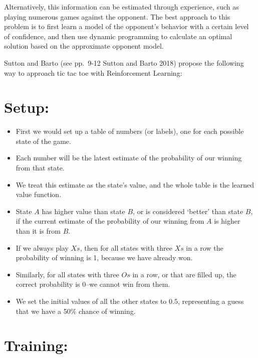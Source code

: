 \documentclass[
  letterpaper,
  DIV=11,
  numbers=noendperiod]{scrreprt}
\theoremstyle{definition}
\theoremstyle{remark}
\begin{document}
Alternatively, this information can be estimated through experience,
such as playing numerous games against the opponent. The best approach
to this problem is to first learn a model of the opponent's behavior
with a certain level of confidence, and then use dynamic programming to
calculate an optimal solution based on the approximate opponent model.

Sutton and Barto (see pp.~9-12 Sutton and Barto 2018) propose the
following way to approach tic tac toe with Reinforcement Learning:

\section*{Setup:}\label{setup}


\begin{itemize}
\item
  First we would set up a table of numbers (or labels), one for each
  possible state of the game.
\item
  Each number will be the latest estimate of the probability of our
  winning from that state.
\item
  We treat this estimate as the state's value, and the whole table is
  the learned value function.
\item
  State \(A\) has higher value than state \(B\), or is considered
  `better' than state \(B\), if the current estimate of the probability
  of our winning from \(A\) is higher than it is from \(B\).
\item
  If we always play \(Xs\), then for all states with three \(Xs\) in a
  row the probability of winning is 1, because we have already won.
\item
  Similarly, for all states with three \(Os\) in a row, or that are
  filled up, the correct probability is 0--we cannot win from them.
\item
  We set the initial values of all the other states to \(0.5\),
  representing a guess that we have a 50\% chance of winning.
\end{itemize}

\section*{Training:}\label{training}

\end{document}
